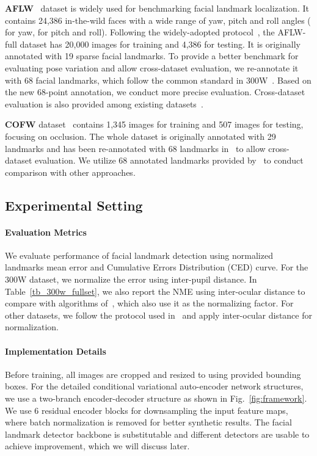 \documentclass[10pt,twocolumn,letterpaper]{article}
\begin{document}
\noindent\textbf{AFLW}~\cite{AFLW} dataset is widely used for benchmarking facial landmark localization. It contains 24,386 in-the-wild faces with a wide range of yaw, pitch and roll angles ( for yaw,  for pitch and roll). Following the widely-adopted protocol~\cite{CFSS,zhu2016unconstrained}, the AFLW-full dataset has 20,000 images for training and 4,386 for testing. It is originally annotated with 19 sparse facial landmarks. To provide a better benchmark for evaluating pose variation and allow cross-dataset evaluation, we re-annotate it with 68 facial landmarks, which follow the common standard in 300W~\cite{sagonas2013300,shen2015first}. Based on the new 68-point annotation, we conduct more precise evaluation. Cross-dataset evaluation is also provided among existing datasets~\cite{LFPW,AFW,HELEN}. 

\noindent\textbf{COFW} dataset~\cite{burgos2013robust} contains 1,345 images for training and 507 images for testing, focusing on occlusion. The whole dataset is originally annotated with 29 landmarks and has been re-annotated with 68 landmarks in~\cite{cofw68} to allow cross-dataset evaluation. We utilize 68 annotated landmarks provided by~\cite{cofw68} to conduct comparison with other approaches. 

\subsection{Experimental Setting}
\paragraph{Evaluation Metrics} 
We evaluate performance of facial landmark detection using normalized landmarks mean error and Cumulative Errors Distribution (CED) curve. For the 300W dataset, we normalize the error using inter-pupil distance. In Table~\ref{tb_300w_fullset}, we also report the NME using inter-ocular distance to compare with algorithms of~\cite{SAN,pifa,rdr,PCD-CNN}, which also use it as the normalizing factor. For other datasets, we follow the protocol used in~\cite{sagonas2013300,MDM} and apply inter-ocular distance for normalization. 

\vspace{-0.12in}
\paragraph{Implementation Details} 
Before training, all images are cropped and resized to  using provided bounding boxes. For the detailed conditional variational auto-encoder network structures, we use a two-branch encoder-decoder structure as shown in Fig.~\ref{fig:framework}. We use 6 residual encoder blocks for downsampling the input feature maps, where batch normalization is removed for better synthetic results. The facial landmark detector backbone is substitutable and different detectors are usable to achieve improvement, which we will discuss later. 
\end{document}
